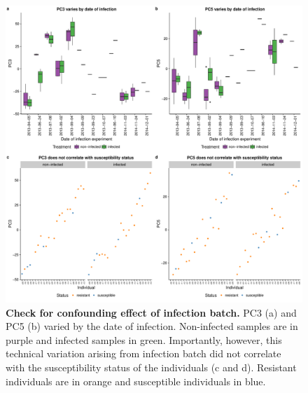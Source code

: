 \begin{figure}[ht]
\centering
\includegraphics[width=5in]{img/ch03/batch-infection.pdf}
\caption[Check for confounding effect of infection batch.]{
\textbf{Check for confounding effect of infection batch.} PC3 (a) and PC5 (b)
varied by the date of infection. Non-infected samples are in purple
and infected samples in green. Importantly, however, this technical
variation arising from infection batch did not correlate with the
susceptibility status of the individuals (c and d). Resistant
individuals are in orange and susceptible individuals in blue.
}
\label{fig:infection}
\end{figure}

